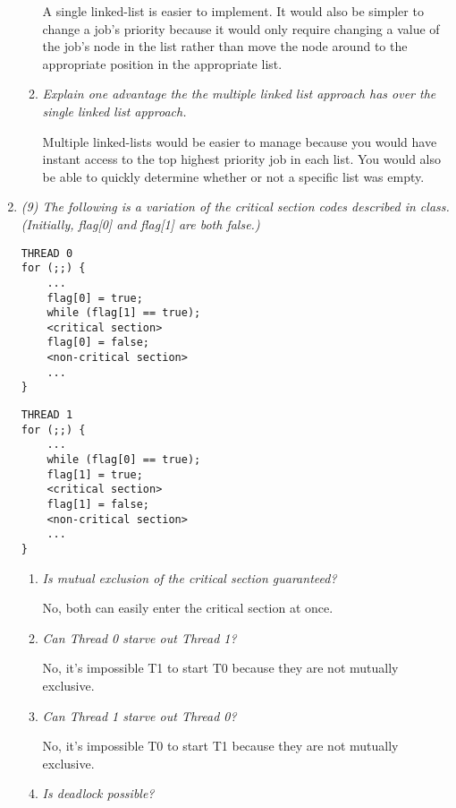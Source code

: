 \documentclass[letterpaper,11pt]{article}
\begin{document}
\begin{enumerate}
\begin{enumerate}
A single linked-list is easier to implement.  It would also be simpler to change a job's priority because it would only require changing a value of the job's node in the list rather than move the node around to the appropriate position in the appropriate list.
\item \emph{Explain one advantage the the multiple linked list approach has over the single linked list approach.}

Multiple linked-lists would be easier to manage because you would have instant access to the top highest priority job in each list.  You would also be able to quickly determine whether or not a specific list was empty.
\end{enumerate}
\item \emph{(9) The following is a variation of the critical section codes described in class. (Initially, flag[0] and flag[1] are both false.)}

\begin{minipage}[t]{0.5\textwidth}
\begin{verbatim}
THREAD 0
for (;;) {
    ...
    flag[0] = true;
    while (flag[1] == true);
    <critical section>        
    flag[0] = false;
    <non-critical section>
    ...
}
\end{verbatim}
\end{minipage}

\begin{minipage}[t]{0.5\textwidth}
\begin{verbatim}
THREAD 1
for (;;) {
    ...
    while (flag[0] == true);
    flag[1] = true;
    <critical section>        
    flag[1] = false;
    <non-critical section>
    ...
}
\end{verbatim}
\end{minipage}

\begin{enumerate}
\item \emph{Is mutual exclusion of the critical section guaranteed?}

No, both can easily enter the critical section at once.
\item \emph{Can Thread 0 starve out Thread 1?}

No, it's impossible T1 to start T0 because they are not mutually exclusive.
\item \emph{Can Thread 1 starve out Thread 0?}

No, it's impossible T0 to start T1 because they are not mutually exclusive.
\item \emph{Is deadlock possible?}


\end{enumerate}
\end{enumerate}
\end{document}
